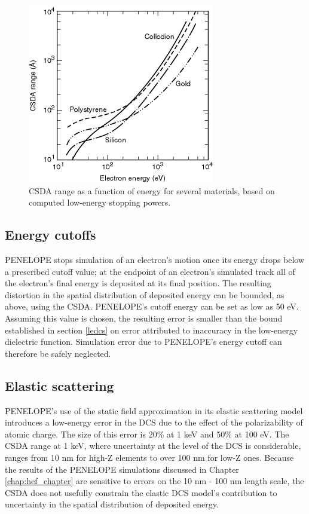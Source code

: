 \documentclass [11pt, proquest, article] {uwthesis}[2016/11/22]
\begin{document}
\begin{figure}[h] 
\caption{CSDA range as a function of energy for several materials, based on computed low-energy stopping powers. \cite{csdarange}}
\label{fig:csda}
\centering
\includegraphics[scale=0.7]{../Figures/csda.png}
\end{figure}

\subsection{Energy cutoffs} \label{cutoffs}
PENELOPE stops simulation of an electron's motion once its energy drops below a prescribed cutoff value; at the endpoint of an electron's simulated track all of the electron's final energy is deposited at its final position. The resulting distortion in the spatial distribution of deposited energy can be bounded, as above, using the CSDA. PENELOPE's cutoff energy can be set as low as 50 eV. Assuming this value is chosen, the resulting error is smaller than the bound established in section \ref{ledcs} on error attributed to inaccuracy in the low-energy dielectric function. Simulation error due to PENELOPE's energy cutoff can therefore be safely neglected.

\subsection{Elastic scattering}
PENELOPE's use of the static field approximation in its elastic scattering model introduces a low-energy error in the DCS due to the effect of the polarizability of atomic charge.\cite{salvat2003optical} The size of this error is 20\% at 1 keV and 50\% at 100 eV. \cite{salvat2008penelope} The CSDA range at 1 keV, where uncertainty at the level of the DCS is considerable, ranges from 10 nm for high-Z elements to over 100 nm for low-Z ones. Because the results of the PENELOPE simulations discussed in Chapter \ref{chap:hef_chapter}  are sensitive to errors on the 10 nm - 100 nm length scale, the CSDA does not usefully constrain the elastic DCS model's contribution to uncertainty in the spatial distribution of deposited energy. 
\end{document}
